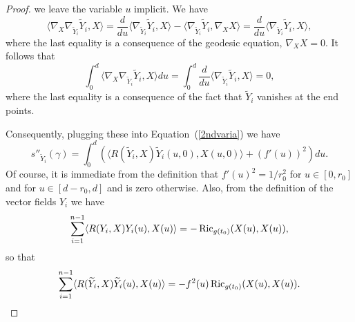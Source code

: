 \begin{proof}
we leave the variable $u$ implicit. We have
$$\langle
\nabla_X\nabla_{\widetilde Y_i}\widetilde
Y_i,X\rangle=\frac{d}{du}\langle \nabla_{\widetilde Y_i}\widetilde
Y_i,X\rangle-\langle \nabla_{\widetilde Y_i}\widetilde
Y_i,\nabla_XX\rangle=\frac{d}{du}\langle \nabla_{\widetilde
Y_i}\widetilde Y_i,X\rangle,$$ where the last equality is a
consequence of the geodesic equation, $\nabla_XX=0$. It follows that
$$\int_0^d\langle
\nabla_X\nabla_{\widetilde Y_i}\widetilde Y_i,X\rangle
du=\int_0^d\frac{d}{du}\langle \nabla_{\widetilde Y_i}\widetilde
Y_i,X\rangle=0,$$ where the last equality is a consequence of the
fact that $\widetilde Y_i$ vanishes at the end points.

Consequently, plugging these into Equation~(\ref{2ndvaria}) we have
\begin{equation} \label{sformula} s''_{\widetilde Y_i}(\gamma) =
  \int_0^d\left(\langle R(\widetilde Y_i,X)\widetilde
Y_i(u,0),X(u,0)\rangle+(f'(u))^2\right)du. \end{equation} Of course,
it is immediate from the definition that $f'(u)^2=1/r_0^2$ for $u\in
[0,r_0]$ and for $u\in [d-r_0,d]$ and is zero otherwise. Also, from
the definition of the vector fields $Y_i$ we have
$$\sum_{i=1}^{n-1}\langle
R(Y_i,X)Y_i(u),X(u)\rangle=-\operatorname{Ric}_{g(t_0)}(X(u),X(u)),$$ so that
$$\sum_{i=1}^{n-1}\langle
R(\widetilde Y_i,X)\widetilde
Y_i(u),X(u)\rangle=-f^2(u)\operatorname{Ric}_{g(t_0)}(X(u),X(u)).$$


\end{proof}
